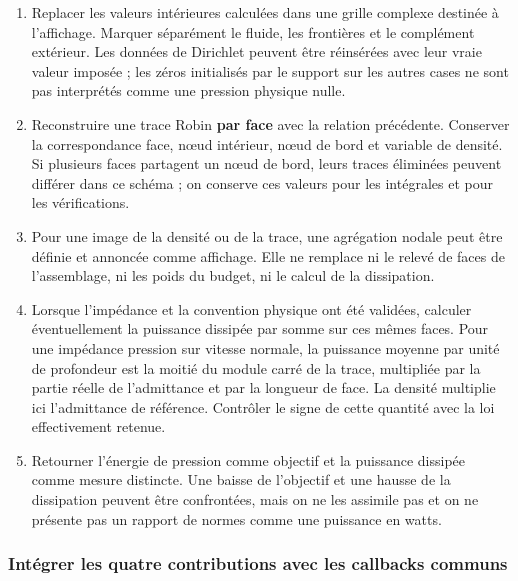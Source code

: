 \documentclass[11pt,a4paper]{article}
\begin{document}
\begin{enumerate}
\item Replacer les valeurs intérieures calculées dans une grille complexe destinée à l'affichage. Marquer séparément le fluide, les frontières et le complément extérieur. Les données de Dirichlet peuvent être réinsérées avec leur vraie valeur imposée ; les zéros initialisés par le support sur les autres cases ne sont pas interprétés comme une pression physique nulle.
\item Reconstruire une trace Robin \textbf{par face} avec la relation précédente. Conserver la correspondance face, nœud intérieur, nœud de bord et variable de densité. Si plusieurs faces partagent un nœud de bord, leurs traces éliminées peuvent différer dans ce schéma ; on conserve ces valeurs pour les intégrales et pour les vérifications.
\item Pour une image de la densité ou de la trace, une agrégation nodale peut être définie et annoncée comme affichage. Elle ne remplace ni le relevé de faces de l'assemblage, ni les poids du budget, ni le calcul de la dissipation.
\item Lorsque l'impédance et la convention physique ont été validées, calculer éventuellement la puissance dissipée par somme sur ces mêmes faces. Pour une impédance pression sur vitesse normale, la puissance moyenne par unité de profondeur est la moitié du module carré de la trace, multipliée par la partie réelle de l'admittance et par la longueur de face. La densité multiplie ici l'admittance de référence. Contrôler le signe de cette quantité avec la loi effectivement retenue.
\item Retourner l'énergie de pression comme objectif et la puissance dissipée comme mesure distincte. Une baisse de l'objectif et une hausse de la dissipation peuvent être confrontées, mais on ne les assimile pas et on ne présente pas un rapport de normes comme une puissance en watts.
\end{enumerate}

\subsubsection{Intégrer les quatre contributions avec les callbacks communs}
\end{document}
